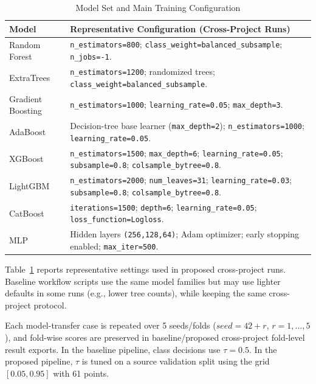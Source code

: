 \documentclass[conference]{IEEEtran}
\begin{document}
\begin{table}[t]
\caption{Model Set and Main Training Configuration}
\label{tab:exp_models}
\centering
\footnotesize
\setlength{\tabcolsep}{3.8pt}
\renewcommand{\arraystretch}{1.14}
\begin{tabularx}{\columnwidth}{|>{\raggedright\arraybackslash}p{}|>{\raggedright\arraybackslash}X|}
\hline
\textbf{Model} & \textbf{Representative Configuration (Cross-Project Runs)} \\
\hline
Random Forest & \texttt{n\_estimators=800}; \texttt{class\_weight=balanced\_subsample}; \texttt{n\_jobs=-1}. \\
\hline
ExtraTrees & \texttt{n\_estimators=1200}; randomized trees; \texttt{class\_weight=balanced\_subsample}. \\
\hline
Gradient Boosting & \texttt{n\_estimators=1000}; \texttt{learning\_rate=0.05}; \texttt{max\_depth=3}. \\
\hline
AdaBoost & Decision-tree base learner (\texttt{max\_depth=2}); \texttt{n\_estimators=1000}; \texttt{learning\_rate=0.05}. \\
\hline
XGBoost & \texttt{n\_estimators=1500}; \texttt{max\_depth=6}; \texttt{learning\_rate=0.05}; \texttt{subsample=0.8}; \texttt{colsample\_bytree=0.8}. \\
\hline
LightGBM & \texttt{n\_estimators=2000}; \texttt{num\_leaves=31}; \texttt{learning\_rate=0.03}; \texttt{subsample=0.8}; \texttt{colsample\_bytree=0.8}. \\
\hline
CatBoost & \texttt{iterations=1500}; \texttt{depth=6}; \texttt{learning\_rate=0.05}; \texttt{loss\_function=Logloss}. \\
\hline
MLP & Hidden layers \texttt{(256,128,64)}; Adam optimizer; early stopping enabled; \texttt{max\_iter=500}. \\
\hline
\end{tabularx}
\renewcommand{\arraystretch}{1.0}
\normalsize
\end{table}

Table~\ref{tab:exp_models} reports representative settings used in proposed cross-project runs. Baseline workflow scripts use the same model families but may use lighter defaults in some runs (e.g., lower tree counts), while keeping the same cross-project protocol.

Each model-transfer case is repeated over 5 seeds/folds (\(seed=42+r\), \(r=1,\dots,5\)), and fold-wise scores are preserved in baseline/proposed cross-project fold-level result exports. In the baseline pipeline, class decisions use \(\tau=0.5\). In the proposed pipeline, \(\tau\) is tuned on a source validation split using the grid \([0.05,0.95]\) with 61 points.
\end{document}
